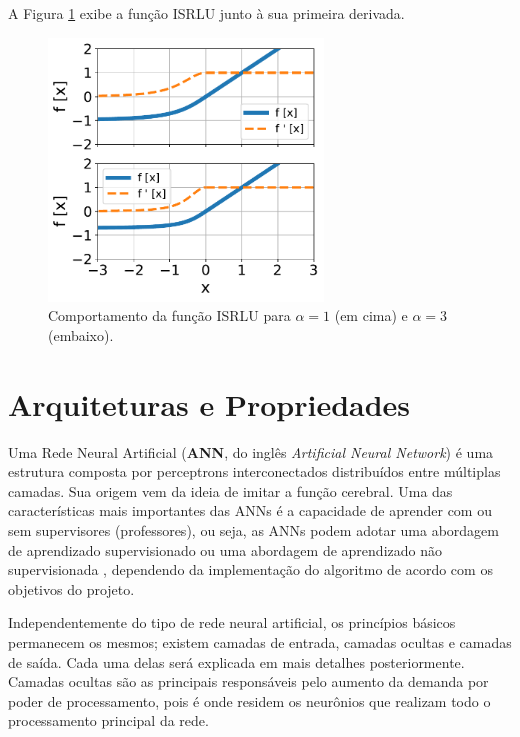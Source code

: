A Figura \ref{fig:ann_isrlu_function} exibe a função ISRLU \citep{carlile2017improving} junto à sua primeira derivada.

\begin{figure}[H]
    \centering
    \includegraphics[width=0.65\textwidth]{figs/ann_isrlu_function.pdf}

    \caption{Comportamento da função ISRLU para $\alpha=1$ (em cima) e $\alpha=3$ (embaixo).}
    \label{fig:ann_isrlu_function}
\end{figure}


\linebreak
\newpage


\section{Arquiteturas e Propriedades}
\label{sec:ann_arch_and_prop}

Uma Rede Neural Artificial (\textbf{ANN}, do inglês \textit{Artificial Neural Network}) é uma estrutura composta por perceptrons interconectados distribuídos entre múltiplas camadas. Sua origem vem da ideia de imitar a função cerebral. Uma das características mais importantes das ANNs é a capacidade de aprender com ou sem supervisores (professores), ou seja, as ANNs podem adotar uma abordagem de aprendizado supervisionado ou uma abordagem de aprendizado não supervisionada \citep{haykin1999neural}, dependendo da implementação do algoritmo de acordo com os objetivos do projeto.


Independentemente do tipo de rede neural artificial, os princípios básicos permanecem os mesmos; existem camadas de entrada, camadas ocultas e camadas de saída. Cada uma delas será explicada em mais detalhes posteriormente. Camadas ocultas são as principais responsáveis pelo aumento da demanda por poder de processamento, pois é onde residem os neurônios que realizam todo o processamento principal da rede.



